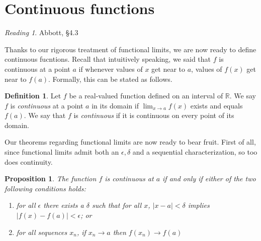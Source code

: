\documentclass[11pt,oneside]{amsbook}
\newcommand{\R}{\mathbb R}
\theoremstyle{definition}
\newtheorem{exerc}{Exercise}[section]
\theoremstyle{plain}
\newtheorem{proposition}[theorem]{Proposition}
\theoremstyle{definition}
\newtheorem{definition}[theorem]{Definition}
\theoremstyle{remark}
\newtheorem*{reading}{Reading}
\numberwithin{equation}{section}
\numberwithin{figure}{section}
\begin{document}



\newpage
\section{Continuous functions}

\begin{reading}
  Abbott, \S 4.3
\end{reading}

Thanks to our rigorous treatment of functional limits, we are now ready to define continuous fucntions. Recall that intuitively speaking, we said that $f$ is continuous at a point $a$ if whenever values of $x$ get near to $a$, values of $f(x)$ get near to $f(a)$. Formally, this can be stated as follows.

\begin{definition}
  Let $f$ be a real-valued function defined on an interval of $\R$. We say $f$ is \emph{continuous} at a point $a$ in its domain if $\lim_{x\to a}f(x)$ exists and equals $f(a)$. We say that $f$ is \emph{continuous} if it is continuous on every point of its domain.
\end{definition}

Our theorems regarding functional limits are now ready to bear fruit. First of all, since functional limits admit both an $\epsilon,\delta$ and a sequential characterization, so too does continuity.

\begin{proposition}
  The function $f$ is continuous at $a$ if and only if either of the two following conditions holds:
  \begin{enumerate}
  \item for all $\epsilon$ there exists a $\delta$ such that for all $x$, $|x-a|<\delta$ implies $|f(x)-f(a)|<\epsilon$; or
  \item for all sequences $x_n$, if $x_n\to a$ then $f(x_n)\to f(a)$
  \end{enumerate}
\end{proposition}  
\end{document}
